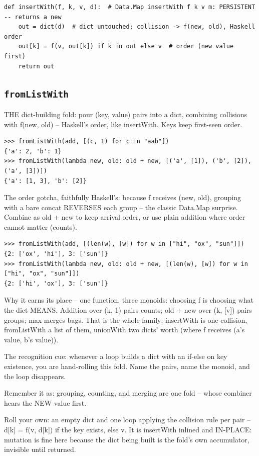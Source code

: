 \documentclass[10pt,letterpaper]{book}
\begin{document}
\begin{lstlisting}[style=ex]
def insertWith(f, k, v, d):  # Data.Map insertWith f k v m: PERSISTENT -- returns a new
    out = dict(d)  # dict untouched; collision -> f(new, old), Haskell order
    out[k] = f(v, out[k]) if k in out else v  # order (new value first)
    return out
\end{lstlisting}
\subsection{\texttt{fromListWith}}\label{def:fromListWith}
THE dict-building fold: pour (key, value) pairs into a dict, combining collisions with f(new, old) -- Haskell's order, like insertWith. Keys keep first-seen order.
\begin{lstlisting}[style=ex]
>>> fromListWith(add, [(c, 1) for c in "aab"])
{'a': 2, 'b': 1}
>>> fromListWith(lambda new, old: old + new, [('a', [1]), ('b', [2]), ('a', [3])])
{'a': [1, 3], 'b': [2]}
\end{lstlisting}

The order gotcha, faithfully Haskell's: because f receives (new, old), grouping with a bare concat REVERSES each group -- the classic Data.Map surprise. Combine as old + new to keep arrival order, or use plain addition where order cannot matter (counts).

\begin{lstlisting}[style=ex]
>>> fromListWith(add, [(len(w), [w]) for w in ["hi", "ox", "sun"]])
{2: ['ox', 'hi'], 3: ['sun']}
>>> fromListWith(lambda new, old: old + new, [(len(w), [w]) for w in ["hi", "ox", "sun"]])
{2: ['hi', 'ox'], 3: ['sun']}
\end{lstlisting}

Why it earns its place -- one function, three monoids: choosing f is choosing what the dict MEANS. Addition over (k, 1) pairs counts; old + new over (k, [v]) pairs groups; max merges bags. That is the whole family: insertWith is one collision, fromListWith a list of them, unionWith two dicts' worth (where f receives (a's value, b's value)).


The recognition cue: whenever a loop builds a dict with an if-else on key existence, you are hand-rolling this fold. Name the pairs, name the monoid, and the loop disappears.


Remember it as: grouping, counting, and merging are one fold -- whose combiner hears the NEW value first.


Roll your own: an empty dict and one loop applying the collision rule per pair -- d[k] = f(v, d[k]) if the key exists, else v. It is insertWith inlined and IN-PLACE: mutation is fine here because the dict being built is the fold's own accumulator, invisible until returned.
\end{document}
